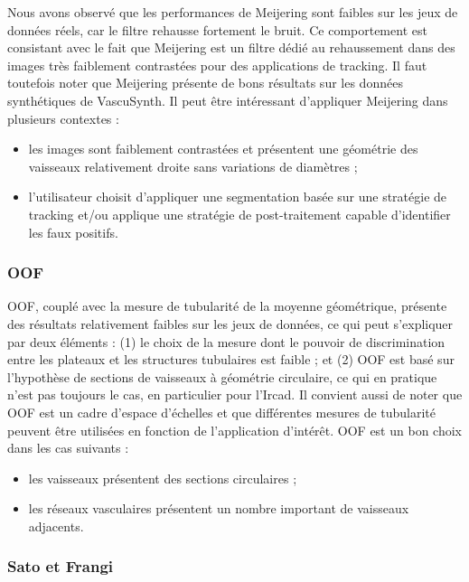  Nous avons observé que les performances de Meijering sont faibles sur les jeux de données réels, car le filtre rehausse fortement le bruit. Ce comportement est consistant avec le fait que Meijering est un filtre dédié au rehaussement dans des images très faiblement contrastées pour des applications de tracking. Il faut toutefois noter que Meijering présente de bons résultats sur les données synthétiques de VascuSynth. Il peut être intéressant d’appliquer Meijering dans plusieurs contextes :

\begin{itemize}
  \item les images sont faiblement contrastées et présentent une géométrie des vaisseaux relativement droite sans variations de diamètres ;
  \item l'utilisateur choisit d'appliquer une segmentation basée sur une stratégie de tracking et/ou applique une stratégie de post-traitement capable d'identifier les faux positifs.
\end{itemize}

\subsubsection*{OOF}

OOF, couplé avec la mesure de tubularité de la moyenne géométrique, présente des résultats relativement faibles sur les jeux de données, ce qui peut s'expliquer par deux éléments : (1) le choix de la mesure dont le pouvoir de discrimination entre les plateaux et les structures tubulaires est faible ; et (2) OOF est basé sur l'hypothèse de sections de vaisseaux à géométrie circulaire, ce qui en pratique n'est pas toujours le cas, en particulier pour l'Ircad. Il convient aussi de noter que OOF est un cadre d'espace d'échelles et que différentes mesures de tubularité peuvent être utilisées en fonction de l'application d'intérêt. OOF est un bon choix dans les cas suivants : 

\begin{itemize}
  \item les vaisseaux présentent des sections circulaires ;
  \item les réseaux vasculaires présentent un nombre important de vaisseaux adjacents.
\end{itemize}

\subsubsection{Sato et Frangi}

